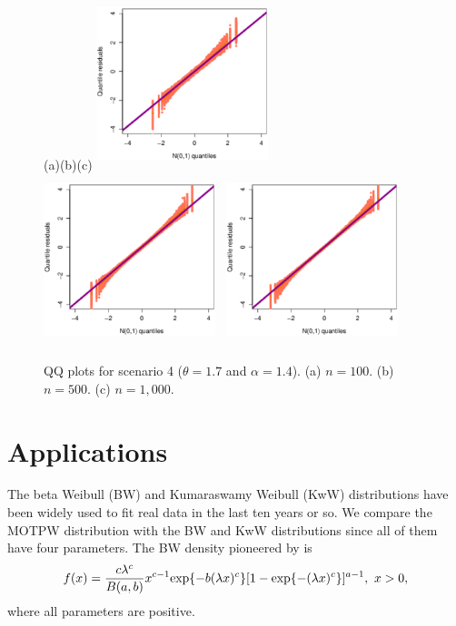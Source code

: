 \documentclass[12pt]{article}
\begin{document}
		\begin{figure}[!htb]\small
			\begin{center}
				(a)\hspace{4.5cm}(b)\hspace{4.5cm}(c)
				\includegraphics[width=5cm,height=5cm]{n_100_theta_1_7_alpha_1_4.eps}~
				\includegraphics[width=5cm,height=5cm]{n_500_theta_1_7_alpha_1_4.eps}~
				\includegraphics[width=5cm,height=5cm]{n_1000_theta_1_7_alpha_1_4.eps}
				\caption{QQ plots for scenario 4 ($\theta=1.7$ and $\alpha=1.4$). (a) $n=100$. (b) $n=500$. (c) $n = 1,000$.}\label{graf_simulacao_regressao_theta_1_7_alpha_1_4}
			\end{center}
		\end{figure}

\section{Applications}\label{applications}
The beta Weibull (BW) and Kumaraswamy Weibull (KwW) distributions have been widely
used to fit real data in the last ten years or so. We compare the MOTPW distribution with the BW and
KwW distributions since all of them have four parameters. The BW density pioneered  by \cite{Lee2007} is
\begin{eqnarray*}
f(x)=\frac{c\lambda^c}{B(a,b)}x^{c-1} {\rm exp}\{-b(\lambda
x)^c\}[1-{\rm exp}\{-(\lambda x)^c\}]^{a-1},\,\,x>0,
\end{eqnarray*}
where all parameters are positive.
\end{document}
